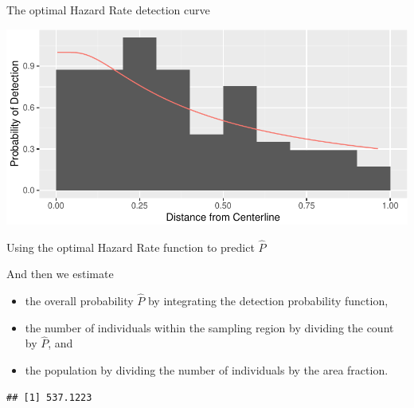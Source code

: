 \documentclass[
  ignorenonframetext,
]{beamer}
\newenvironment{Shaded}{\begin{snugshade}}{\end{snugshade}}
\newcommand{\ControlFlowTok}[1]{\textcolor[rgb]{0.13,0.29,0.53}{\textbf{#1}}}
\newcommand{\DataTypeTok}[1]{\textcolor[rgb]{0.13,0.29,0.53}{#1}}
\newcommand{\DecValTok}[1]{\textcolor[rgb]{0.00,0.00,0.81}{#1}}
\newcommand{\KeywordTok}[1]{\textcolor[rgb]{0.13,0.29,0.53}{\textbf{#1}}}
\newcommand{\NormalTok}[1]{#1}
\newcommand{\OperatorTok}[1]{\textcolor[rgb]{0.81,0.36,0.00}{\textbf{#1}}}
\newcommand{\StringTok}[1]{\textcolor[rgb]{0.31,0.60,0.02}{#1}}
\providecommand{\tightlist}{%
  \setlength{\itemsep}{0pt}\setlength{\parskip}{0pt}}
\begin{document}
\begin{frame}{The optimal Hazard Rate detection curve}
\protect\hypertarget{the-optimal-hazard-rate-detection-curve}{}

\includegraphics{distance_sampling_files/figure-beamer/unnamed-chunk-19-1.pdf}

\end{frame}

\begin{frame}[fragile]{Using the optimal Hazard Rate function to predict
\(\hat P\)}
\protect\hypertarget{using-the-optimal-hazard-rate-function-to-predict-hat-p}{}

And then we estimate

\begin{itemize}
\tightlist
\item
  the overall probability \(\hat P\) by integrating the detection
  probability function,
\item
  the number of individuals within the sampling region by dividing the
  count by \(\hat P\), and
\item
  the population by dividing the number of individuals by the area
  fraction.
\end{itemize}

\scriptsize

\begin{Shaded}
\end{Shaded}

\begin{verbatim}
## [1] 537.1223
\end{verbatim}

\end{frame}
\end{document}
